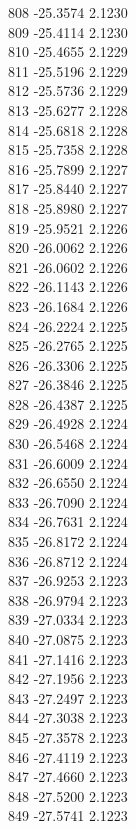 \documentclass[11pt]{article}
\theoremstyle{definition}
\theoremstyle{plain}
\begin{document}
{808 -25.3574 2.1230\\
809 -25.4114 2.1230\\
810 -25.4655 2.1229\\
811 -25.5196 2.1229\\
812 -25.5736 2.1229\\
813 -25.6277 2.1228\\
814 -25.6818 2.1228\\
815 -25.7358 2.1228\\
816 -25.7899 2.1227\\
817 -25.8440 2.1227\\
818 -25.8980 2.1227\\
819 -25.9521 2.1226\\
820 -26.0062 2.1226\\
821 -26.0602 2.1226\\
822 -26.1143 2.1226\\
823 -26.1684 2.1226\\
824 -26.2224 2.1225\\
825 -26.2765 2.1225\\
826 -26.3306 2.1225\\
827 -26.3846 2.1225\\
828 -26.4387 2.1225\\
829 -26.4928 2.1224\\
830 -26.5468 2.1224\\
831 -26.6009 2.1224\\
832 -26.6550 2.1224\\
833 -26.7090 2.1224\\
834 -26.7631 2.1224\\
835 -26.8172 2.1224\\
836 -26.8712 2.1224\\
837 -26.9253 2.1223\\
838 -26.9794 2.1223\\
839 -27.0334 2.1223\\
840 -27.0875 2.1223\\
841 -27.1416 2.1223\\
842 -27.1956 2.1223\\
843 -27.2497 2.1223\\
844 -27.3038 2.1223\\
845 -27.3578 2.1223\\
846 -27.4119 2.1223\\
847 -27.4660 2.1223\\
848 -27.5200 2.1223\\
849 -27.5741 2.1223\\
}
\end{document}
